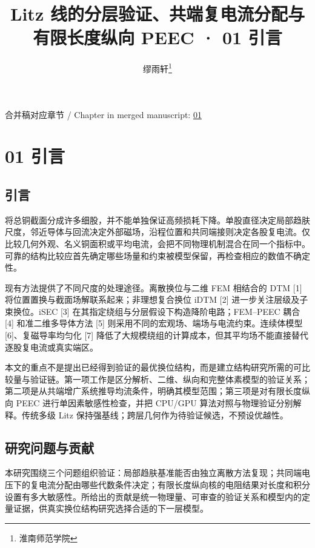 \documentclass[journal,10pt]{IEEEtran}
\begin{document}
\title{Litz 线的分层验证、共端复电流分配与有限长度纵向 PEEC · 01 引言}
\author{缪雨轩\thanks{淮南师范学院}}

\maketitle
\noindent 合并稿对应章节 / Chapter in merged manuscript: \href{paper_zh-CN_ieee.pdf#chapter-01}{01}\par
\FloatBarrier
\section*{01 引言}
\hypertarget{chapter-01}{}
\subsection*{引言}
\hypertarget{01.introduction.heading}{}
将总铜截面分成许多细股，并不能单独保证高频损耗下降。单股直径决定局部趋肤尺度，邻近导体与回流决定外部磁场，沿程位置和共同端接则决定各股复电流。仅比较几何外观、名义铜面积或平均电流，会把不同物理机制混合在同一个指标中。可靠的结构比较应首先确定哪些场量和约束被模型保留，再检查相应的数值不确定性。


现有方法提供了不同尺度的处理途径。离散换位与二维 FEM 相结合的 DTM [1] 将位置置换与截面场解联系起来；非理想复合换位 iDTM [2] 进一步关注层级及子束换位。iSEC [3] 在其指定绕组与分层假设下构造降阶电路；FEM–PEEC 耦合 [4] 和准二维多导体方法 [5] 则采用不同的宏观场、端场与电流约束。连续体模型 [6]、复磁导率均匀化 [7] 降低了大规模绕组的计算成本，但其平均场不能直接替代逐股复电流或真实端区。


本文的重点不是提出已经得到验证的最优换位结构，而是建立结构研究所需的可比较量与验证链。第一项工作是区分解析、二维、纵向和完整体素模型的验证关系；第二项是从共端增广系统推导均流条件，明确其模型范围；第三项是对有限长度纵向 PEEC 进行单因素敏感性检查，并把 CPU/GPU 算法对照与物理验证分别解释。传统多级 Litz 保持强基线；跨层几何作为待验证候选，不预设优越性。


\subsection*{研究问题与贡献}
\hypertarget{01.scope.heading}{}
本研究围绕三个问题组织验证：局部趋肤基准能否由独立离散方法复现；共同端电压下的复电流分配由哪些代数条件决定；有限长度纵向核的电阻结果对长度和积分设置有多大敏感性。所给出的贡献是统一物理量、可审查的验证关系和模型内的定量证据，供真实换位结构研究选择合适的下一层模型。
\end{document}
